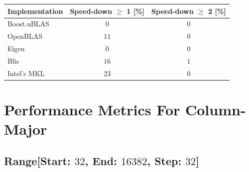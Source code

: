 \begin{table}[ht]
    \begin{tabular}{|l|c|c|}
        \hline
        \textbf{Implementation} & \textbf{Speed-down $\geq$ 1 [\%]} & \textbf{Speed-down $\geq$ 2 [\%]}\\
        \hline
        Boost.uBLAS & $0$ & $0$ \\
        \hline
        OpenBLAS    & $11$ & $0$ \\
        \hline
        Eigen       & $0$ & $0$ \\
        \hline
        Blis        & $16$ & $1$ \\
        \hline
        Intel's MKL & $23$ & $0$ \\
        \hline
    \end{tabular}
\end{table}

\clearpage
\section{Performance Metrics For Column-Major}

\subsection*{Range[Start: $32$, End: $16382$, Step: $32$]}

